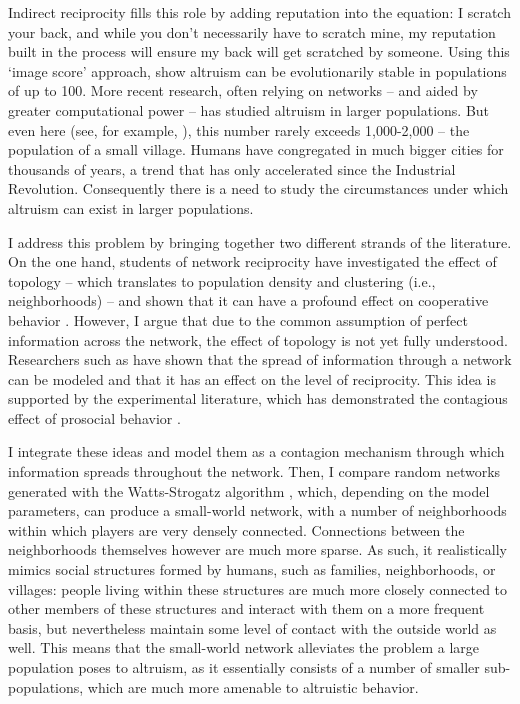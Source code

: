 \documentclass{JASSS}
\begin{document}
Indirect reciprocity fills this role by adding reputation into the equation: I scratch your back, and while you don't necessarily have to scratch mine, my reputation built in the process will ensure my back will get scratched by someone. Using this `image score' approach, \cite{Nowak1998} show altruism can be evolutionarily stable in populations of up to 100. More recent research, often relying on networks -- and aided by greater computational power -- has studied altruism in larger populations. But even here (see, for example, \cite{Peleteiro2014}), this number rarely exceeds 1,000-2,000 -- the population of a small village. Humans have congregated in much bigger cities for thousands of years, a trend that has only accelerated since the Industrial Revolution. Consequently there is a need to study the circumstances under which altruism can exist in larger populations.

I address this problem by bringing together two different strands of the literature. On the one hand, students of network reciprocity have investigated the effect of topology -- which translates to population density and clustering (i.e., neighborhoods) -- and shown that it can have a profound effect on cooperative behavior \citep{Santos2008}. However, I argue that due to the common assumption of perfect information across the network, the effect of topology is not yet fully understood. Researchers such as \cite{Mohtashemi2003} have shown that the spread of information through a network can be modeled and that it has an effect on the level of reciprocity. This idea is supported by the experimental literature, which has demonstrated the contagious effect of prosocial behavior \citep{Tsvetkova2014, Kang2015, Ito2016}.

I integrate these ideas and model them as a contagion mechanism through which information spreads throughout the network. Then, I compare random networks generated with the  Watts-Strogatz algorithm \citep{Watts1998}, which, depending on the model parameters, can produce a small-world network, with a number of neighborhoods within which players are very densely connected. Connections between the neighborhoods themselves however are much more sparse. As such, it realistically mimics social structures formed by humans, such as families, neighborhoods, or villages: people living within these structures are much more closely connected to other members of these structures and interact with them on a more frequent basis, but nevertheless maintain some level of contact with the outside world as well. This means that the small-world network alleviates the problem a large population poses to altruism, as it essentially consists of a number of smaller sub-populations, which are much more amenable to altruistic behavior.
\end{document}
